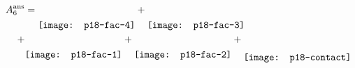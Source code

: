 \documentclass{standalone}
\begin{document}
$
 \begin{aligned}
A_6^{\text{ans}}&=\raisebox{-5.5mm}{\texttt{[image: p18-fac-4]}}+\raisebox{-5.5mm}{\texttt{[image: p18-fac-3]}}  \label{Ans6pt18} \\
+&\raisebox{-5.5mm}{\texttt{[image: p18-fac-1]}}+\raisebox{-5.5mm}{\texttt{[image: p18-fac-2]}}+\raisebox{-6.5mm}{\texttt{[image: p18-contact]}}
 \end{aligned}
$
\end{document}
